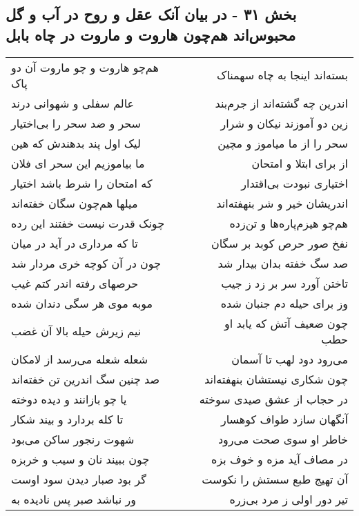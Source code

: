 \begin{center}
\section*{بخش ۳۱ - در بیان آنک عقل و روح در آب و گل محبوس‌اند هم‌چون هاروت و ماروت در چاه بابل}
\label{sec:sh031}
\begin{longtable}{l p{0.5cm} r}
هم‌چو هاروت و چو ماروت آن دو پاک
&&
بسته‌اند اینجا به چاه سهمناک
\\
عالم سفلی و شهوانی درند
&&
اندرین چه گشته‌اند از جرم‌بند
\\
سحر و ضد سحر را بی‌اختیار
&&
زین دو آموزند نیکان و شرار
\\
لیک اول پند بدهندش که هین
&&
سحر را از ما میاموز و مچین
\\
ما بیاموزیم این سحر ای فلان
&&
از برای ابتلا و امتحان
\\
که امتحان را شرط باشد اختیار
&&
اختیاری نبودت بی‌اقتدار
\\
میلها هم‌چون سگان خفته‌اند
&&
اندریشان خیر و شر بنهفته‌اند
\\
چونک قدرت نیست خفتند این رده
&&
هم‌چو هیزم‌پاره‌ها و تن‌زده
\\
تا که مرداری در آید در میان
&&
نفخ صور حرص کوبد بر سگان
\\
چون در آن کوچه خری مردار شد
&&
صد سگ خفته بدان بیدار شد
\\
حرصهای رفته اندر کتم غیب
&&
تاختن آورد سر بر زد ز جیب
\\
موبه موی هر سگی دندان شده
&&
وز برای حیله دم جنبان شده
\\
نیم زیرش حیله بالا آن غضب
&&
چون ضعیف آتش که یابد او حطب
\\
شعله شعله می‌رسد از لامکان
&&
می‌رود دود لهب تا آسمان
\\
صد چنین سگ اندرین تن خفته‌اند
&&
چون شکاری نیستشان بنهفته‌اند
\\
یا چو بازانند و دیده دوخته
&&
در حجاب از عشق صیدی سوخته
\\
تا کله بردارد و بیند شکار
&&
آنگهان سازد طواف کوهسار
\\
شهوت رنجور ساکن می‌بود
&&
خاطر او سوی صحت می‌رود
\\
چون ببیند نان و سیب و خربزه
&&
در مصاف آید مزه و خوف بزه
\\
گر بود صبار دیدن سود اوست
&&
آن تهیج طبع سستش را نکوست
\\
ور نباشد صبر پس نادیده به
&&
تیر دور اولی ز مرد بی‌زره
\\
\end{longtable}
\end{center}
